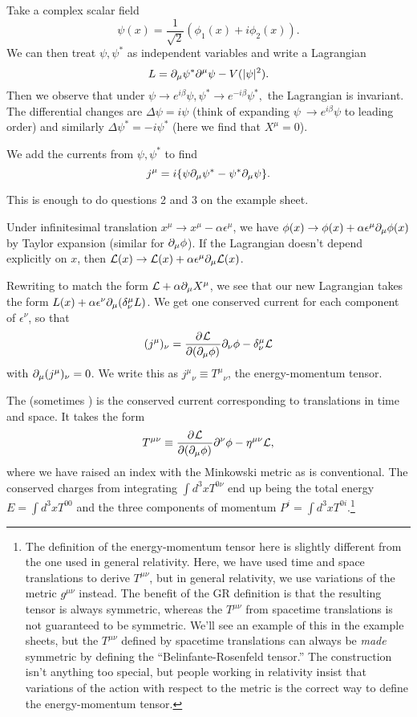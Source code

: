 \begin{exm}
Take a complex scalar field $$\psi(x)=\frac{1}{\sqrt{2}}(\phi_1(x)+i\phi_2(x)).$$ We can then treat $\psi, \psi^*$ as independent variables and write a Lagrangian
$$L=\partial_\mu \psi^* \partial^\mu \psi - V(|\psi|^2).$$
Then we observe that under $\psi\to e^{i\beta}\psi, \psi^* \to e^{-i\beta}\psi^*,$ the Lagrangian is invariant. The differential changes are $\Delta \psi = i \psi$ (think of expanding $\psi\ \to e^{i\beta}\psi$ to leading order) and similarly $\Delta \psi^*=-i\psi^*$ (here we find that $X^\mu=0$).

We add the currents from $\psi, \psi^*$ to find
$$j^\mu = i\{ \psi \partial_\mu \psi^* - \psi^* \partial_\mu \psi\}.$$
\end{exm}
This is enough to do questions 2 and 3 on the example sheet.
\begin{exm}
Under infinitesimal translation $x^\mu \to x^\mu -\alpha \epsilon^\mu$, we have $\phi(x)\to \phi(x)+\alpha \epsilon^\mu \partial_\mu \phi(x)$ by Taylor expansion (similar for $\partial_\mu\phi$). If the Lagrangian doesn't depend explicitly on $x$, then $\mathcal L(x)\to \mathcal L(x) +\alpha \epsilon^\mu \partial_\mu \mathcal L(x)$.

Rewriting to match the form $\mathcal L+\alpha \partial_\mu X^\mu$, we see that our new Lagrangian takes the form
$L(x)+\alpha \epsilon^\nu \partial_\mu (\delta^\mu_\nu L)$. We get one conserved current for each component of $\epsilon^\nu$, so that
$$(j^\mu)_\nu = \frac{\partial^{} \mathcal L}{\partial (\partial_\mu \phi) ^{}}\partial_\nu \phi - \delta^\mu_\nu \mathcal L$$ with $\partial_\mu(j^\mu)_\nu=0$.
We write this as $j^\mu{}_\nu \equiv T^\mu{}_\nu$, the energy-momentum tensor. 

\begin{defn}
The  (sometimes ) is the conserved current corresponding to translations in time and space. It takes the form 
$$T^{\mu\nu} \equiv \frac{\partial^{} \mathcal L}{\partial (\partial_\mu \phi) ^{}}\partial^\nu \phi - \eta^{\mu\nu} \mathcal L,$$
where we have raised an index with the Minkowski metric as is conventional. The conserved charges from integrating $\int d^3x T^{0\nu}$ end up being the total energy $E=\int d^3x T^{00}$ and the three components of momentum $P^i=\int d^3x T^{0i}$.\footnote{The definition of the energy-momentum tensor here is slightly different from the one used in general relativity. Here, we have used time and space translations to derive $T^{\mu\nu}$, but in general relativity, we use variations of the metric $g^{\mu\nu}$ instead. The benefit of the GR definition is that the resulting tensor is always symmetric, whereas the $T^{\mu\nu}$ from spacetime translations is not guaranteed to be symmetric. We'll see an example of this in the example sheets, but the $T^{\mu\nu}$ defined by spacetime translations can always be \emph{made} symmetric by defining the ``Belinfante-Rosenfeld tensor.'' The construction isn't anything too special, but people working in relativity insist that variations of the action with respect to the metric is the correct way to define the energy-momentum tensor.}
\end{defn}
\end{exm}